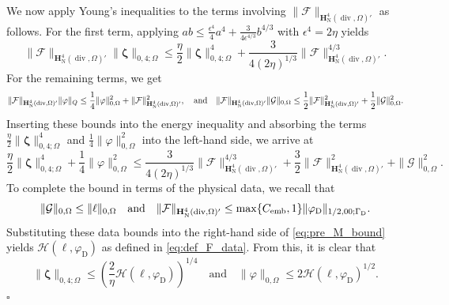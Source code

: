 \documentclass[fleqn,a4paper]{cas-sc}
\newcommand\qan{\quad\hbox{and}\quad}
\newcommand\vdiv{\mathop{\mathrm{div}}\nolimits}
\newcommand{\bzeta}{\boldsymbol{\zeta}}
\newcommand{\0}{\boldsymbol{0}}
\newcommand\cG{\mathcal{G}}
\newcommand\cF{\mathcal{F}}
\newcommand\bH{\mathbf{H}}
\numberwithin{equation}{section}
\numberwithin{figure}{section}
\newenvironment{proof}{\noindent{\it Proof.}}{\hfill$\square$}
\begin{document}
\begin{proof}
\begin{equation*}
    \end{equation*}
    We now apply Young's inequalities to the terms involving $\|\cF\|_{\bH^{4}_{\mathrm{N}}(\vdiv,\Omega)'}$ as follows. For the first term, applying $ab \le \frac{\epsilon^4}{4} a^4 + \frac{3}{4\epsilon^{4/3}} b^{4/3}$ with $\epsilon^4 = 2\eta$ yields
    \begin{equation*}
        \|\cF\|_{\bH^{4}_{\mathrm{N}}(\vdiv,\Omega)'} \|\bzeta\|_{0,4;\Omega} \le \frac{\eta}{2} \|\bzeta\|_{0,4;\Omega}^4 + \frac{3}{4(2\eta)^{1/3}} \|\cF\|_{\bH^{4}_{\mathrm{N}}(\vdiv,\Omega)'}^{4/3}.
    \end{equation*}
    For the remaining terms, we get
    \begin{align*}
        \|\cF\|_{\bH^{4}_{\mathrm{N}}(\vdiv,\Omega)'} \|\varphi\|_Q \le \frac{1}{4} \|\varphi\|_{0, \Omega}^2 + \|\cF\|_{\bH^{4}_{\mathrm{N}}(\vdiv,\Omega)'}^2, \qan 
        \|\cF\|_{\bH^{4}_{\mathrm{N}}(\vdiv,\Omega)'} \|\cG\|_{0, \Omega} \le \frac{1}{2}\|\cF\|_{\bH^{4}_{\mathrm{N}}(\vdiv,\Omega)'}^2 + \frac{1}{2}\|\cG\|_{0, \Omega}^2.
    \end{align*}
     Inserting these bounds into the energy inequality and absorbing the terms $\frac{\eta}{2} \|\bzeta\|_{0,4;\Omega}^4$ and $\frac{1}{4} \|\varphi\|_{0, \Omega}^2$ into the left-hand side, we arrive at
    \begin{equation}\label{eq:pre_M_bound}
        \frac{\eta}{2} \|\bzeta\|_{0,4;\Omega}^4 + \frac{1}{4}\|\varphi\|_{0, \Omega}^2 \le  \frac{3}{4(2\eta)^{1/3}} \|\cF\|_{\bH^{4}_{\mathrm{N}}(\vdiv,\Omega)'}^{4/3} + \frac{3}{2} \|\cF\|_{\bH^{4}_{\mathrm{N}}(\vdiv,\Omega)'}^2 + \|\cG\|_{0, \Omega}^2.
    \end{equation}
    To complete the bound in terms of the physical data, we recall that
    \begin{equation*}
        \|\cG\|_{0, \Omega} \le \|\ell\|_{0,\Omega} \qan 
        \|\cF\|_{\bH^{4}_{\mathrm{N}}(\vdiv,\Omega)'} \le \max\{C_{\mathrm{emb}}, 1\} \|\varphi_{\mathrm{D}}\|_{1/2,00;\Gamma_{\mathrm{D}}}.
    \end{equation*}
    Substituting these data bounds into the right-hand side of \eqref{eq:pre_M_bound} yields $\mathcal{H}(\ell, \varphi_{\mathrm{D}})$ as defined in \eqref{eq:def_F_data}.
    From this, it is clear that
    \begin{equation*}
        \|\bzeta\|_{0,4;\Omega} \le \left( \frac{2}{\eta}  \mathcal{H}(\ell, \varphi_{\mathrm{D}}) \right)^{1/4} \quad \text{and} \quad \|\varphi\|_{0, \Omega} \le 2  \mathcal{H}(\ell, \varphi_{\mathrm{D}})^{1/2}.

\end{equation*}
\end{proof}
\end{document}
